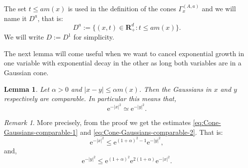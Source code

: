 \documentclass[a4paper,oneside,10pt]{amsproc}
\theoremstyle{plain}
\newtheorem{lemma}{Lemma}
\theoremstyle{remark}
\newtheorem*{remark}{Remark}
\theoremstyle{definition}
\renewcommand{\leq}{\leqslant}
\renewcommand{\leq}{\leqslant}
\newcommand{\R}{\mathbf R}
\newcommand{\e}{\mathrm{e}} %
\renewcommand{\leq}{\leqslant}%
\begin{document}
The set $t \leq a m(x)$ is used in the definition of the cones
$\Gamma_x^{(A, a)}$ and we will name it $D^a$, that is:
\begin{equation}
  \label{eq:Definition-cut-off-set-D}
  D^a := \{(x, t) \in \R^d_+ : t \leq a m(x)\}.
\end{equation}
We will write $D := D^1$ for simplicity.

The next lemma will come useful when we want to cancel exponential
growth in one variable with exponential decay in the other as long
both variables are in a Gaussian cone.
\begin{lemma}\label{lem:Cone-Gaussians-comparable}
  Let $\alpha > 0$ and $|x - y| \leq \alpha m(x)$. Then the Gaussians in $x$ and $y$
  respectively are comparable. In particular this means that,
  \begin{equation*}
    \e^{-|x|^2} \simeq \e^{-|y|^2}.
  \end{equation*}
\end{lemma}
\begin{remark}
  More precisely, from the proof we get the estimates \eqref{eq:Cone-Gaussians-comparable-1}
  and \eqref{eq:Cone-Gaussians-comparable-2}. That is:
  \begin{equation*}
    \e^{-|x|^2} \leq \e^{(1 + \alpha)^2 - 1} \e^{-|y|^2},
  \end{equation*}
  and,
  \begin{equation*}
    \e^{-|y|^2} \leq \e^{(1 + \alpha)^2} \e^{2(1 + \alpha)} \e^{-|x|^2}.
  \end{equation*}
\end{remark}
\end{document}
